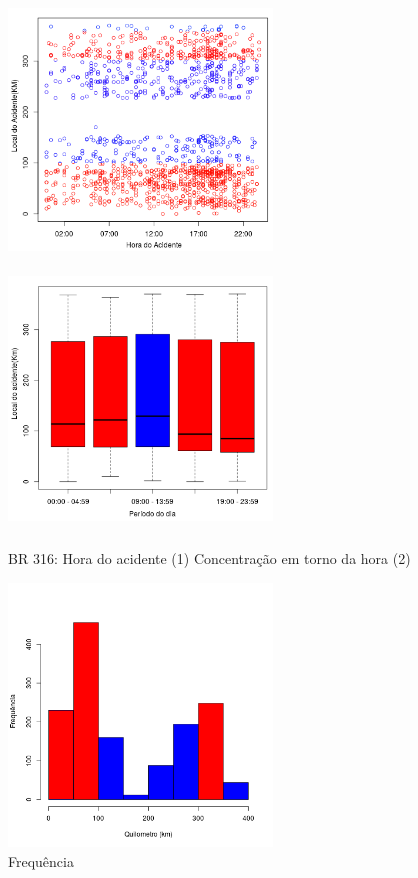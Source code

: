 \begin{figure}[h]
	\caption{BR 316: Hora do acidente (1) Concentração em torno da hora (2)}
	\includegraphics[width=7cm,height=7cm]{Figuras/Preprocess/br316_1.png}
	\includegraphics[width=7cm,height=7cm]{Figuras/Preprocess/br316_2.png}

\end{figure}

\quad \quad
\begin{figure}[h]
	\centering
	\caption{ Frequência}
	\includegraphics[width=7cm,height=7cm]{Figuras/Preprocess/br316_3.png}
\end{figure}

